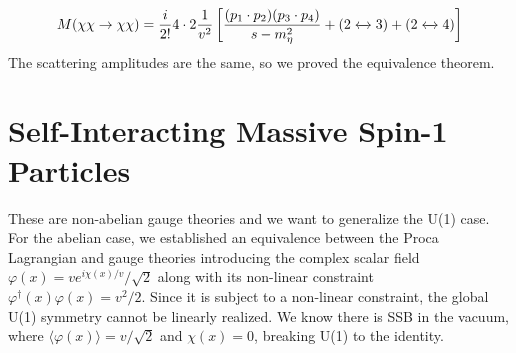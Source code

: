 \documentclass[../main.tex]{subfiles}
\begin{document}
\[
M(\chi\chi\to\chi\chi)=\frac{i}{2!}4\cdot2\frac{1}{v^2}\left[\frac{(p_1\cdot p_2)(p_3\cdot p_4)}{s-m_\eta^2}+(2\xleftrightarrow[]{}3)+(2\xleftrightarrow[]{}4)\right]
\]
The scattering amplitudes are the same, so we proved the equivalence theorem.
\section{Self-Interacting Massive Spin-1 Particles}
These are non-abelian gauge theories and we want to generalize the U(1) case. For the abelian case, we established an equivalence between the Proca Lagrangian and gauge theories introducing the complex scalar field $\varphi(x)=ve^{i\chi(x)/v}/\sqrt{2}$ along with its non-linear constraint\\
$\varphi^\dagger(x)\varphi(x)=v^2/2$. Since it is subject to a non-linear constraint, the global U(1) symmetry cannot be linearly realized. We know there is SSB in the vacuum, where $\langle\varphi(x)\rangle=v/\sqrt{2}$ and $\chi(x)=0$, breaking U(1) to the identity.\\
\end{document}
